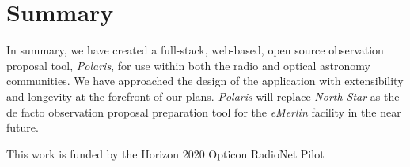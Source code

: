 \documentclass[11pt,twoside]{article}
\begin{document}
\section{Summary}\label{sec:summary}
In summary, we have created a full-stack, web-based, open source observation proposal tool, \emph{Polaris},
for use within both the radio and optical astronomy communities.
We have approached the design of the application with extensibility and longevity at the forefront of
our plans.
\emph{Polaris} will replace \emph{North Star} as the de facto observation proposal preparation tool for
the \emph{eMerlin} facility in the near future.

\acknowledgements This work is funded by the Horizon 2020 Opticon RadioNet Pilot


\end{document}
